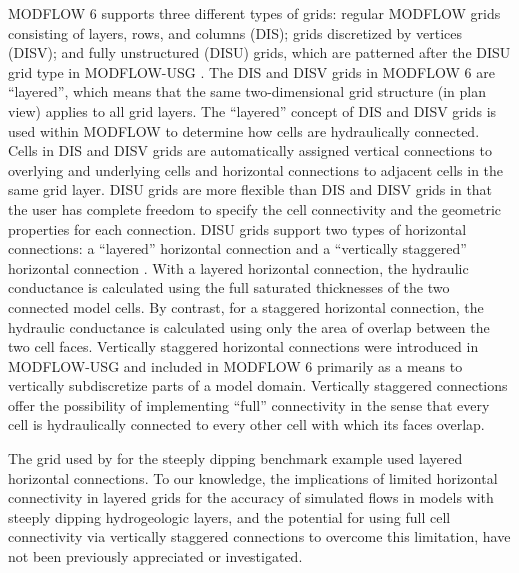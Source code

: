 \documentclass{article}
\begin{document}
MODFLOW 6 supports three different types of grids: regular MODFLOW grids consisting of layers, rows, and columns (DIS);  grids discretized by vertices (DISV); and fully unstructured (DISU) grids, which are patterned after the DISU grid type in MODFLOW-USG  \citep{modflowusg}.  The DIS and DISV grids in MODFLOW 6 are ``layered'', which means that the same two-dimensional grid structure (in plan view) applies to all grid layers.  The ``layered'' concept of DIS and DISV grids is used within MODFLOW to determine how cells are hydraulically connected.  Cells in DIS and DISV grids are automatically assigned vertical connections to overlying and underlying cells and horizontal connections to adjacent cells in the same grid layer.  DISU grids are more flexible than DIS and DISV grids in that the user has complete freedom to specify the cell connectivity and the geometric properties for each connection.  DISU grids support two types of horizontal connections: a ``layered'' horizontal connection and a ``vertically staggered'' horizontal connection \citep{modflow6gwf}.  With a layered horizontal connection, the hydraulic conductance is calculated using the full saturated thicknesses of the two connected model cells.  By contrast, for a staggered horizontal connection, the hydraulic conductance is calculated using only the area of overlap between the two cell faces. Vertically staggered horizontal connections were introduced in MODFLOW-USG \citep{modflowusg} and included in MODFLOW 6 \citep{modflow6gwf} primarily as a means to vertically subdiscretize parts of a model domain.  Vertically staggered connections offer the possibility of implementing ``full'' connectivity in the sense that every cell is hydraulically connected to every other cell with which its faces overlap.

The grid used by \cite{bardot2022} for the steeply dipping benchmark example used layered horizontal connections.  To our knowledge, the implications of limited horizontal connectivity in layered grids for the accuracy of simulated flows in models with steeply dipping hydrogeologic layers, and the potential for using full cell connectivity via vertically staggered connections to overcome this limitation, have not been previously appreciated or investigated.

\end{document}
